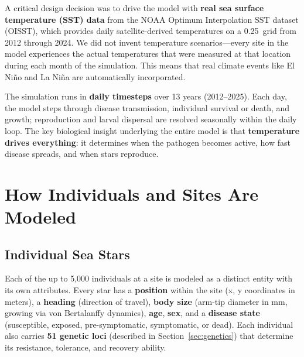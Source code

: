 \documentclass[11pt]{article}
\begin{document}
A critical design decision was to drive the model with \textbf{real sea surface temperature (SST) data} from the NOAA Optimum Interpolation SST dataset (OISST), which provides daily satellite-derived temperatures on a 0.25\textdegree\ grid from 2012 through 2024. We did not invent temperature scenarios---every site in the model experiences the actual temperatures that were measured at that location during each month of the simulation. This means that real climate events like El Ni\~no and La Ni\~na are automatically incorporated.

The simulation runs in \textbf{daily timesteps} over 13 years (2012--2025). Each day, the model steps through disease transmission, individual survival or death, and growth; reproduction and larval dispersal are resolved seasonally within the daily loop. The key biological insight underlying the entire model is that \textbf{temperature drives everything}: it determines when the pathogen becomes active, how fast disease spreads, and when stars reproduce.

\section{How Individuals and Sites Are Modeled}

\subsection{Individual Sea Stars}

Each of the up to 5,000 individuals at a site is modeled as a distinct entity with its own attributes. Every star has a \textbf{position} within the site (x, y coordinates in meters), a \textbf{heading} (direction of travel), \textbf{body size} (arm-tip diameter in mm, growing via von Bertalanffy dynamics), \textbf{age}, \textbf{sex}, and a \textbf{disease state} (susceptible, exposed, pre-symptomatic, symptomatic, or dead). Each individual also carries \textbf{51 genetic loci} (described in Section~\ref{sec:genetics}) that determine its resistance, tolerance, and recovery ability.
\end{document}
